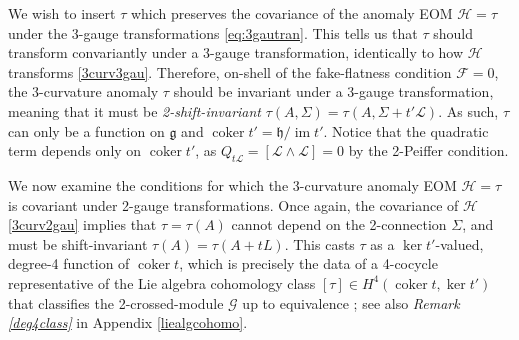 \documentclass[onecolumn]{article}
\theoremstyle{theorem}
\theoremstyle{remark}
\theoremstyle{example}
\theoremstyle{definition}
\numberwithin{equation}{section}
\def\g{\mathfrak g}
\def\h{\mathfrak h}
\begin{document}
We wish to insert $\tau$ which preserves the covariance of the anomaly EOM $\mathcal{H}=\tau$ under the 3-gauge transformations \eqref{eq:3gautran}. This tells us that $\tau$ should transform convariantly under a 3-gauge transformation, identically to how $\mathcal{H}$ transforms \eqref{3curv3gau}. Therefore, on-shell of the fake-flatness condition $\mathcal{F}=0$, the 3-curvature anomaly $\tau$ should be {{invariant}} under a 3-gauge transformation, meaning that it must be {\it {2-shift-invariant}} $\tau(A,\Sigma) = \tau(A,\Sigma+t'\mathcal{L})$. As such, $\tau$ can only be a function on $\mathfrak{g}$ and $\operatorname{coker}t' = \mathfrak{h}/\operatorname{im}t'$. Notice that the quadratic term depends only on $\operatorname{coker}t'$, as $Q_{t\mathcal{L}} = [\mathcal{L}\wedge \mathcal{L}] =0$ by the 2-Peiffer condition.

We now examine the conditions for which the 3-curvature anomaly EOM $\mathcal{H} = \tau$ is covariant under 2-gauge transformations. Once again, the covariance of $\mathcal{H}$ \eqref{3curv2gau} implies that $\tau=\tau(A)$ cannot depend on the 2-connection $\Sigma$, and must be shift-invariant $\tau(A)=\tau(A+tL)$. This casts $\tau$ as a $\operatorname{ker}t'$-valued, degree-4 function of $\operatorname{coker}t$, which is precisely the data of a 4-cocycle representative of the Lie algebra cohomology class $[\tau]\in H^4(\operatorname{coker}t,\operatorname{ker}t')$ that classifies the 2-crossed-module $\mathscr{G}$ up to equivalence \cite{Wag:2006,Ang2018,Brown}; see also {\it {Remark} \ref{deg4class}} in {Appendix} %
 \ref{liealgcohomo}. 


\end{document}
